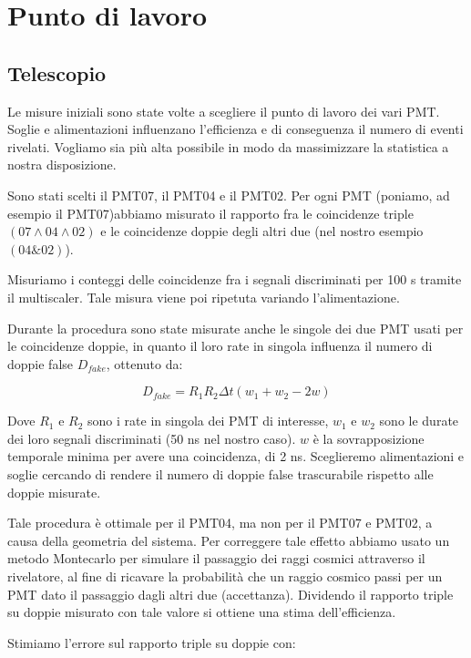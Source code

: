 \documentclass[10pt,a4paper]{article}
\begin{document}
\section{Punto di lavoro}

\subsection{Telescopio}

Le misure iniziali sono state volte a scegliere il punto di lavoro dei vari PMT. Soglie e alimentazioni influenzano l'efficienza e di conseguenza il numero di eventi rivelati. Vogliamo sia più alta possibile in modo da massimizzare la statistica a nostra disposizione. 

Sono stati scelti il PMT07, il PMT04 e il PMT02. Per ogni PMT (poniamo, ad esempio il PMT07)abbiamo misurato il rapporto fra le coincidenze triple $(07\land04\land02)$ e le coincidenze doppie degli altri due (nel nostro esempio $(04\&02)$). 

Misuriamo i conteggi delle coincidenze fra i segnali discriminati per 100 s tramite il multiscaler. Tale misura viene poi ripetuta variando l'alimentazione. 

Durante la procedura sono state misurate anche le singole dei due PMT usati per le coincidenze doppie, in quanto il loro rate in singola influenza il numero di doppie false $D_{fake}$, ottenuto da:

\begin{equation}
D_{fake} = R_1 R_2 \Delta t (w_1 + w_2 - 2w) 
\end{equation}

Dove $R_1$ e $R_2$ sono i rate in singola dei PMT di interesse, $w_1$ e $w_2$ sono le durate dei loro segnali discriminati (50 ns nel nostro caso). $w$ è la sovrapposizione temporale minima per avere una coincidenza, di 2 ns. Sceglieremo alimentazioni e soglie cercando di rendere il numero di doppie false trascurabile rispetto alle doppie misurate.

Tale procedura è ottimale per il PMT04, ma non per il PMT07 e PMT02, a causa della geometria del sistema. 
Per correggere tale effetto abbiamo usato un metodo Montecarlo per simulare il passaggio dei raggi cosmici attraverso il rivelatore, al fine di ricavare la probabilità che un raggio cosmico passi per un PMT dato il passaggio dagli altri due (accettanza). 
Dividendo il rapporto triple su doppie misurato con tale valore si ottiene una stima dell'efficienza.

Stimiamo l'errore sul rapporto triple su doppie con: 
\end{document}
